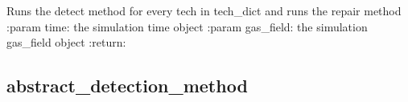 \documentclass[letterpaper,10pt,english]{sphinxmanual}
\begin{document}
\begin{fulllineitems}
\begin{fulllineitems}
\label{\detokenize{index:feast.DetectionModules.ldar_program.LDARProgram.action}}
Runs the detect method for every tech in tech\_dict and runs the repair method
:param time: the simulation time object
:param gas\_field: the simulation gas\_field object
:return:

\end{fulllineitems}


\end{fulllineitems}



\subsection{abstract\_detection\_method}
\label{\detokenize{index:module-feast.DetectionModules.abstract_detection_method}}\label{\detokenize{index:abstract-detection-method}}
\end{document}
